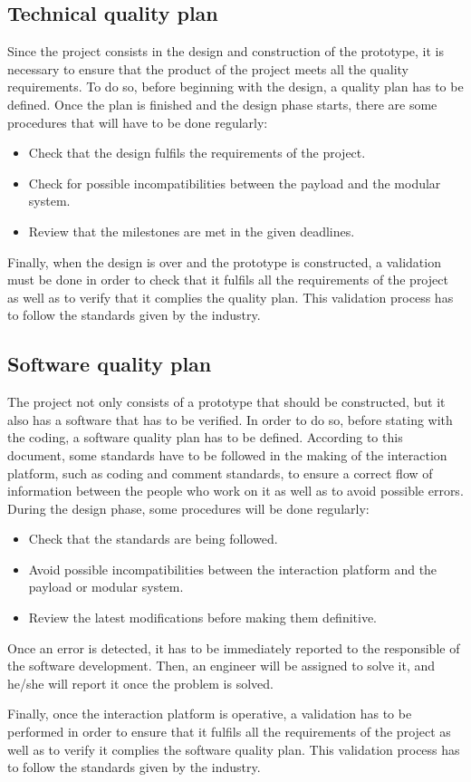 \subsection{Technical quality plan}
Since the project consists in the design and construction of the prototype, it is necessary to ensure that the product of the project meets all the quality requirements. To do so, before beginning with the design, a quality plan has to be defined. Once the plan is finished and the design phase starts, there are some procedures that will have to be done regularly:
\begin{itemize}
	\item Check that the design fulfils the requirements of the project.
	\item Check for possible incompatibilities between the payload and the modular system.
	\item Review that the milestones are met in the given deadlines.
\end{itemize}
Finally, when the design is over and the prototype is constructed, a validation must be done in order to check that it fulfils all the requirements of the project as well as to verify that it complies the quality plan. This validation process has to follow the standards given by the industry.

\subsection{Software quality plan}
The project not only consists of a prototype that should be constructed, but it also has a software that has to be verified. In order to do so, before stating with the coding, a software quality plan has to be defined. According to this document, some standards have to be followed in the making of the interaction platform, such as coding and comment standards, to ensure a correct flow of information between the people who work on it as well as to avoid possible errors.
During the design phase, some procedures will be done regularly:
\begin{itemize}
	\item Check that the standards are being followed.
	\item Avoid possible incompatibilities between the interaction platform and the payload or modular system.
	\item Review the latest modifications before making them definitive.
\end{itemize}
Once an error is detected, it has to be immediately reported to the responsible of the software development. Then, an engineer will be assigned to solve it, and he/she will report it once the problem is solved.

Finally, once the interaction platform is operative, a validation has to be performed in order to ensure that it fulfils all the requirements of the project as well as to verify it complies the software quality plan. This validation process has to follow the standards given by the industry.